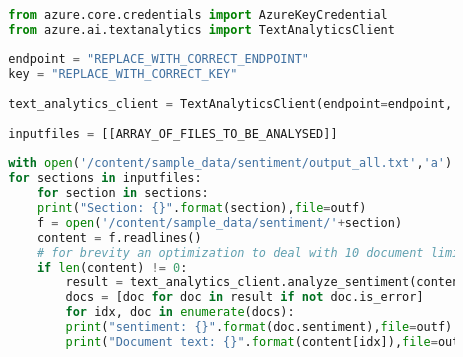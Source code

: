 \noindent\begin{minipage}{\textwidth}
    \begin{lstlisting}[language=Python, caption=Text Analytics code., captionpos=b, label=listing:text_analytics, breaklines=true]

        from azure.core.credentials import AzureKeyCredential
        from azure.ai.textanalytics import TextAnalyticsClient
        
        endpoint = "REPLACE_WITH_CORRECT_ENDPOINT"
        key = "REPLACE_WITH_CORRECT_KEY"
        
        text_analytics_client = TextAnalyticsClient(endpoint=endpoint, credential=AzureKeyCredential(key))
        
        inputfiles = [[ARRAY_OF_FILES_TO_BE_ANALYSED]]
        
        with open('/content/sample_data/sentiment/output_all.txt','a') as outf:
        for sections in inputfiles:
            for section in sections:
            print("Section: {}".format(section),file=outf)
            f = open('/content/sample_data/sentiment/'+section)
            content = f.readlines()
            # for brevity an optimization to deal with 10 document limit is removed
            if len(content) != 0:
                result = text_analytics_client.analyze_sentiment(content, show_opinion_mining=True)
                docs = [doc for doc in result if not doc.is_error]
                for idx, doc in enumerate(docs):
                print("sentiment: {}".format(doc.sentiment),file=outf)
                print("Document text: {}".format(content[idx]),file=outf)
    \end{lstlisting}
\end{minipage}

